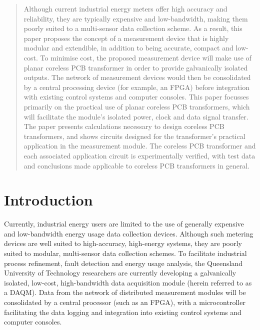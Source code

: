 \documentclass[conference]{IEEEtran}
\begin{document}
\begin{abstract}
Although current industrial energy meters offer high accuracy and reliability, they are typically expensive and low-bandwidth, making them poorly suited to a multi-sensor data collection scheme.  As a result, this paper proposes the concept of a measurement device that is highly modular and extendible, in addition to being accurate, compact and low-cost.  To minimise cost, the proposed measurement device will make use of planar coreless PCB transformer in order to provide galvanically isolated outputs.  The network of measurement devices would then be consolidated by a central processing device (for example, an FPGA) before integration with existing control systems and computer consoles.  
This paper focusses primarily on the practical use of planar coreless PCB transformers, which will facilitate the module's isolated power, clock and data signal transfer.  The paper presents calculations necessary to design coreless PCB transformers, and shows circuits designed for the transformer's practical application in the measurement module.  The coreless PCB transformer and each associated application circuit is experimentally verified, with test data and conclusions made applicable to coreless PCB transformers in general.
\end{abstract}


\IEEEpeerreviewmaketitle

\section{Introduction}
Currently, industrial energy users are limited to the use of generally expensive and low-bandwidth energy usage data collection devices. Although such metering devices are well suited to high-accuracy, high-energy systems, they are poorly suited to modular, multi-sensor data collection schemes.  To facilitate industrial process refinement, fault detection and energy usage analysis, the Queensland University of Technology researchers are currently developing a galvanically isolated, low-cost, high-bandwidth data acquisition module (herein referred to as a DAQM).  Data from the network of distributed measurement modules will be consolidated by a central processor (such as an FPGA), with a microcontroller facilitating the data logging and integration into existing control systems and computer consoles.
\end{document}
